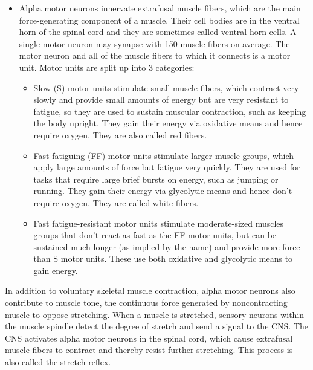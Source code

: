 \documentclass[]{book}
\providecommand{\tightlist}{%
  \setlength{\itemsep}{0pt}\setlength{\parskip}{0pt}}
\begin{document}
\begin{itemize}
\item
  Alpha motor neurons innervate extrafusal muscle fibers, which are the main force-generating component of a muscle. Their cell bodies are in the ventral horn of the spinal cord and they are sometimes called ventral horn cells. A single motor neuron may synapse with 150 muscle fibers on average. The motor neuron and all of the muscle fibers to which it connects is a motor unit. Motor units are split up into 3 categories:

  \begin{itemize}
  \tightlist
  \item
    Slow (S) motor units stimulate small muscle fibers, which contract very slowly and provide small amounts of energy but are very resistant to fatigue, so they are used to sustain muscular contraction, such as keeping the body upright. They gain their energy via oxidative means and hence require oxygen. They are also called red fibers.
  \item
    Fast fatiguing (FF) motor units stimulate larger muscle groups, which apply large amounts of force but fatigue very quickly. They are used for tasks that require large brief bursts on energy, such as jumping or running. They gain their energy via glycolytic means and hence don't require oxygen. They are called white fibers.
  \item
    Fast fatigue-resistant motor units stimulate moderate-sized muscles groups that don't react as fast as the FF motor units, but can be sustained much longer (as implied by the name) and provide more force than S motor units. These use both oxidative and glycolytic means to gain energy.
  \end{itemize}
\end{itemize}

In addition to voluntary skeletal muscle contraction, alpha motor neurons also contribute to muscle tone, the continuous force generated by noncontracting muscle to oppose stretching. When a muscle is stretched, sensory neurons within the muscle spindle detect the degree of stretch and send a signal to the CNS. The CNS activates alpha motor neurons in the spinal cord, which cause extrafusal muscle fibers to contract and thereby resist further stretching. This process is also called the stretch reflex.
\end{document}

